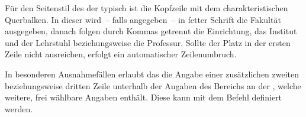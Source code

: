 \begin{Declaration}{}
\begin{Declaration}{}
\begin{Declaration}{}
\begin{Declaration}{}
\begin{Declaration}{}
\printdeclarationlist%
%
%
%
Für den Seitenstil des \CDs der \TnUD typisch ist die Kopfzeile mit dem 
charakteristischen Querbalken. In dieser wird~-- falls angegeben~-- in fetter 
Schrift die Fakultät ausgegeben, danach folgen durch Kommas getrennt die 
Einrichtung, das Institut und der Lehrstuhl beziehungsweise die Professur. 
Sollte der Platz in der ersten Zeile nicht ausreichen, erfolgt ein 
automatischer Zeilenumbruch.

In besonderen Ausnahmefällen erlaubt das \CD die Angabe einer zusätzlichen
zweiten beziehungsweise dritten Zeile unterhalb der Angaben des Bereichs an der 
\TnUD, welche weitere, frei wählbare Angaben enthält. Diese kann mit dem Befehl 
 definiert werden.
\end{Declaration}
\end{Declaration}
\end{Declaration}
\end{Declaration}
\end{Declaration}

